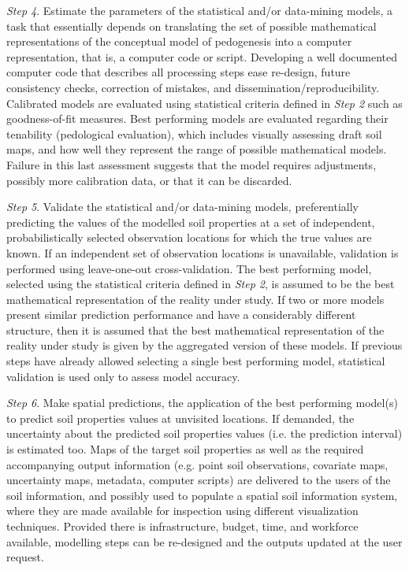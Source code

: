 \noindent\textit{Step 4}. Estimate the parameters of the statistical and/or data-mining 
models, a task that essentially depends on translating the set of possible mathematical 
representations of the conceptual model of pedogenesis into a computer representation, that is, a 
computer code or script. Developing a well documented computer code that describes all processing 
steps ease re-design, future consistency checks, correction of mistakes, and 
dissemination/reproducibility. Calibrated models are evaluated using statistical criteria defined in
\textit{Step 2} such as goodness-of-fit measures. Best performing models are evaluated regarding their
tenability (pedological evaluation), which includes visually assessing draft soil maps, and how well
they represent the range of possible mathematical models. Failure in this last assessment suggests 
that the model requires adjustments, possibly more calibration data, or that it can be discarded.

\noindent\textit{Step 5}. Validate the statistical and/or data-mining models, preferentially
predicting the values of the modelled soil properties at a set of independent, probabilistically 
selected observation locations for which the true values are known. If an independent set of 
observation locations is unavailable, validation is performed using leave-one-out cross-validation. 
The best performing model, selected using the statistical criteria defined in \textit{Step 2}, is 
assumed to be the best mathematical representation of the reality under study. If two or more 
models present similar prediction performance and have a considerably different structure, then it 
is assumed that the best mathematical representation of the reality under study is given by the 
aggregated version of these models. If previous steps have already allowed selecting a single best 
performing model, statistical validation is used only to assess model accuracy.

\noindent\textit{Step 6}. Make spatial predictions, the application of the best performing 
model(s) to predict soil properties values at unvisited locations. If demanded, the uncertainty 
about the predicted soil properties values (i.e. the prediction interval) is estimated too. 
Maps of the target soil properties as well as the required accompanying output information 
(e.g. point soil observations, covariate maps, uncertainty maps, metadata, computer scripts) 
are delivered to the users of the soil information, and possibly used to populate a spatial soil 
information system, where they are made available for inspection using different visualization 
techniques. Provided there is infrastructure, budget, time, and workforce available, modelling
steps can be re-designed and the outputs updated at the user request.

